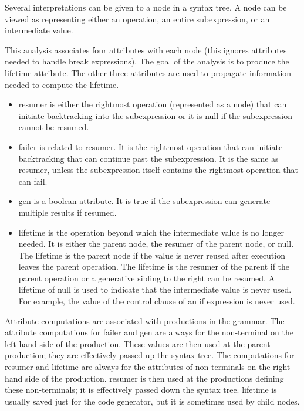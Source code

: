 Several interpretations can be given to a node in a syntax tree. A
node can be viewed as representing either an operation, an entire
subexpression, or an intermediate value.

This analysis associates four attributes with each node (this ignores
attributes needed to handle break expressions).  The goal of the
analysis is to produce the lifetime attribute. The other three
attributes are used to propagate information needed to compute the
lifetime.

\liststyleLxix
\begin{itemize}

\item resumer is either the rightmost operation (represented as a
node) that can initiate backtracking into the subexpression or it is
null if the subexpression cannot be resumed.

\item failer is related to resumer. It is the rightmost operation that
can initiate backtracking that can continue past the subexpression. It
is the same as resumer, unless the subexpression itself contains the
rightmost operation that can fail.

\item gen is a boolean attribute. It is true if the subexpression can
generate multiple results if resumed.

\item lifetime is the operation beyond which the intermediate value is
no longer needed. It is either the parent node, the resumer of the
parent node, or null. The lifetime is the parent node if the value is
never reused after execution leaves the parent operation. The lifetime
is the resumer of the parent if the parent operation or a generative
sibling to the right can be resumed. A lifetime of null is used to
indicate that the intermediate value is never used. For example, the
value of the control clause of an if expression is never used.

\end{itemize}

Attribute computations are associated with productions in the
grammar. The attribute computations for failer and gen are always for
the non-terminal on the left-hand side of the production. These values
are then used at the parent production; they are effectively passed up
the syntax tree. The computations for resumer and lifetime are always
for the attributes of non-terminals on the right-hand side of the
production. resumer is then used at the productions defining these
non-terminals; it is effectively passed down the syntax tree. lifetime
is usually saved just for the code generator, but it is sometimes used
by child nodes.


